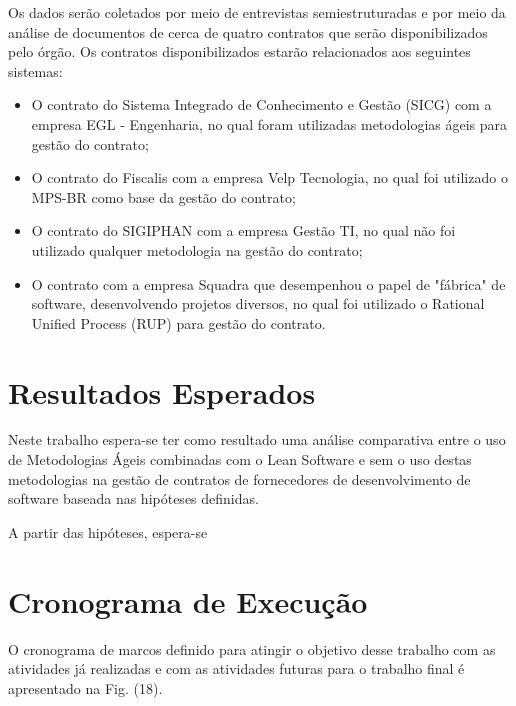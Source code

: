 Os dados serão coletados por meio de entrevistas semiestruturadas e por meio da análise de documentos de cerca de quatro contratos que serão disponibilizados pelo órgão. Os contratos disponibilizados estarão relacionados aos seguintes sistemas:
\begin{itemize}
\item  O contrato do Sistema Integrado de Conhecimento e Gestão (SICG) com a empresa EGL - Engenharia, no qual foram utilizadas metodologias ágeis para gestão do contrato;
\item  O contrato do Fiscalis com a empresa Velp Tecnologia, no qual foi utilizado o MPS-BR como base da gestão do contrato;
\item  O contrato do SIGIPHAN com a empresa Gestão TI, no qual não foi utilizado qualquer metodologia na gestão do contrato;
\item  O contrato com a empresa Squadra que desempenhou o papel de "fábrica" de software, desenvolvendo projetos diversos, no qual foi utilizado o Rational Unified Process (RUP) para gestão do contrato.
\end{itemize}

\section[Resultados Esperados]{Resultados Esperados}

Neste trabalho espera-se ter como resultado uma análise comparativa entre o uso de Metodologias Ágeis combinadas com o Lean Software e sem o uso destas metodologias na gestão de contratos de fornecedores de desenvolvimento de software baseada nas hipóteses definidas.

A partir das hipóteses, espera-se 

\section[Cronograma de Execução]{Cronograma de Execução}

O cronograma de marcos definido para atingir o objetivo desse trabalho com as atividades já realizadas e com as atividades futuras para o trabalho final é apresentado na Fig. (18). 

